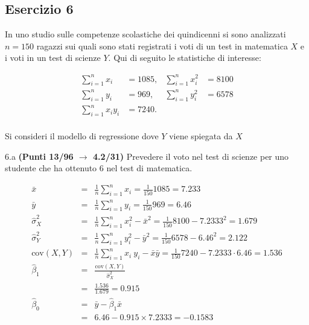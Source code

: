 \documentclass[
  11pt,
]{book}
\theoremstyle{mytheoremstyle}
\theoremstyle{mydefstyle}
\newenvironment{sol}
  {
  \begin{tcolorbox}[enhanced,breakable,arc=0.1mm,boxrule=1pt,colback=white,colframe=iblue,
  title=\bf \fontfamily{lmss}\selectfont \hspace{.5 cm} Soluzione,drop fuzzy shadow]

}{
\end{tcolorbox}
  }
\begin{document}
\subsection{Esercizio 6}\label{esercizio-6-1}

In uno studio sulle competenze scolastiche dei quindicenni si sono analizzati \(n=150\) ragazzi sui quali sono stati registrati i voti di un test in matematica \(X\) e i voti in un test di scienze \(Y\). Qui di seguito le statistiche di interesse:

\begin{align*}
\sum_{i=1}^n x_i &= 1085,   &\sum_{i=1}^n x_i^2 &= 8100 \\
\sum_{i=1}^n y_i &= 969,   &\sum_{i=1}^n y_i^2 &= 6578 \\
\sum_{i=1}^n x_iy_i &= 7240.    \\
\end{align*}

Si consideri il modello di regressione dove \(Y\) viene spiegata da \(X\)

6.a \textbf{(Punti 13/96 \(\rightarrow\) 4.2/31)} Prevedere il voto nel test di scienze per uno studente che ha ottenuto 6 nel test di matematica.

\begin{sol}
\begin{eqnarray*}
           \bar x &=&\frac 1 n\sum_{i=1}^n x_i = \frac {1}{ 150 }  1085 =  7.233 \\
           \bar y &=&\frac 1 n\sum_{i=1}^n y_i = \frac {1}{ 150 }  969 =  6.46 \\
           \hat\sigma_X^2&=&\frac 1 n\sum_{i=1}^n x_i^2-\bar x^2=\frac {1}{ 150 }  8100  - 7.2333 ^2= 1.679 \\
           \hat\sigma_Y^2&=&\frac 1 n\sum_{i=1}^n y_i^2-\bar y^2=\frac {1}{ 150 }  6578  - 6.46 ^2= 2.122 \\
           \text{cov}(X,Y)&=&\frac 1 n\sum_{i=1}^n x_i~y_i-\bar x\bar y=\frac {1}{ 150 }  7240 - 7.2333 \cdot 6.46 = 1.536 \\
           \hat\beta_1 &=& \frac{\text{cov}(X,Y)}{\hat\sigma_X^2} \\
                    &=& \frac{ 1.536 }{ 1.679 }  =  0.915 \\
           \hat\beta_0 &=& \bar y - \hat\beta_1 \bar x\\
                    &=&  6.46 - 0.915 \times  7.2333 = -0.1583 
         \end{eqnarray*}

\end{sol}
\end{document}
